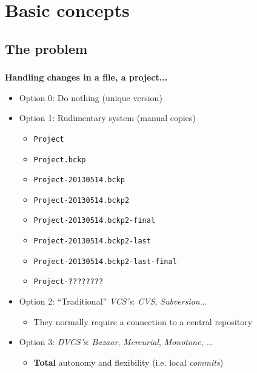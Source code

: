 %
%
%

\section{Basic concepts}
\subsection{The problem}

\begin{frame}
  \frametitle{\insertsubsection}

  \textbf{Handling changes in a file, a project...} \pause
  \begin{itemize}

  \item Option 0: Do nothing (unique version) \pause
    \vspacing

  \item Option 1: Rudimentary system (manual copies)
    \begin{itemize}
    \item \texttt{Project}
    \item \texttt{Project.bckp}
    \item \texttt{Project-20130514.bckp}
    \item \texttt{Project-20130514.bckp2}
    \item \texttt{Project-20130514.bckp2-final}
    \item \texttt{Project-20130514.bckp2-last}
    \item \texttt{Project-20130514.bckp2-last-final}
    \item \texttt{Project-????????} \pause
    \end{itemize}
    \vspacing

  \item Option 2: ``Traditional'' \textit{VCS's}: \textit{CVS},
    \textit{Subversion}...
    \begin{itemize}
    \item They normally require a connection to a central repository
    \end{itemize}  \pause \vspacing

  \item Option 3: \textit{DVCS's}: \textit{Bazaar},
    \textit{Mercurial}, \textit{Monotone}, \textbf{\git}...
    \begin{itemize}
    \item \textbf{Total} autonomy and flexibility (i.e. local \textit{commits})
    \end{itemize}

  \end{itemize}
\end{frame}

